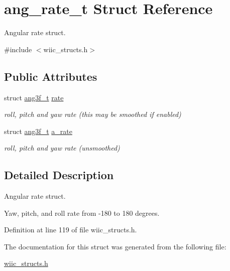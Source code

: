 \hypertarget{structang__rate__t}{\section{ang\-\_\-rate\-\_\-t Struct Reference}
\label{structang__rate__t}
}


Angular rate struct.  




{\ttfamily \#include $<$wiic\-\_\-structs.\-h$>$}

\subsection*{Public Attributes}
\begin{DoxyCompactItemize}
\item 
\hypertarget{structang__rate__t_aa1fa5093d421095a2eeae1ad07b341eb}{struct \hyperlink{structang3f__t}{ang3f\-\_\-t} \hyperlink{structang__rate__t_aa1fa5093d421095a2eeae1ad07b341eb}{rate}}\label{structang__rate__t_aa1fa5093d421095a2eeae1ad07b341eb}

\begin{DoxyCompactList}\small\item\em roll, pitch and yaw rate (this may be smoothed if enabled) \end{DoxyCompactList}\item 
\hypertarget{structang__rate__t_a255841f280d6b3e0bc07549ccabb9a4c}{struct \hyperlink{structang3f__t}{ang3f\-\_\-t} \hyperlink{structang__rate__t_a255841f280d6b3e0bc07549ccabb9a4c}{a\-\_\-rate}}\label{structang__rate__t_a255841f280d6b3e0bc07549ccabb9a4c}

\begin{DoxyCompactList}\small\item\em roll, pitch and yaw rate (unsmoothed) \end{DoxyCompactList}\end{DoxyCompactItemize}


\subsection{Detailed Description}
Angular rate struct. 

Yaw, pitch, and roll rate from -\/180 to 180 degrees. 

Definition at line 119 of file wiic\-\_\-structs.\-h.



The documentation for this struct was generated from the following file\-:\begin{DoxyCompactItemize}
\item 
\hyperlink{wiic__structs_8h}{wiic\-\_\-structs.\-h}\end{DoxyCompactItemize}
